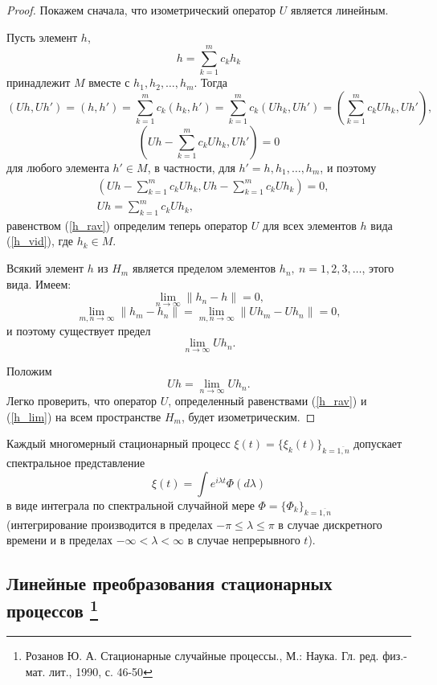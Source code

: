 \begin{proof} Покажем сначала, что изометрический оператор $U$ является линейным.

Пусть элемент $h$, 
\begin{equation} 
	\label{h_vid} h = \sum_{k=1}^{m}c_kh_k 
\end{equation} 
принадлежит $M$ вместе с $h_1, h_2, \ldots, h_m$. Тогда $$(Uh,Uh') = (h,h') = \sum_{k=1}^{m}c_k(h_k,h') = \sum_{k=1}^{m}c_k(Uh_k,Uh') = \left(\sum_{k=1}^{m}c_kUh_k,Uh'\right), $$ $$\left(Uh - \sum_{k=1}^{m}c_kUh_k,Uh'\right) = 0$$ для любого элемента $h' \in M$, в частности, для $h' = h, h_1, \ldots, h_m$, и поэтому
\begin{equation}\label{h_rav}
\begin{split}
    & \left(Uh-\sum_{k=1}^{m}c_kUh_k,Uh-\sum_{k=1}^{m}c_kUh_k\right) = 0, \\
    & Uh = \sum_{k=1}^{m}c_kUh_k,
\end{split}
\end{equation}
равенством (\ref{h_rav}) определим теперь оператор $U$ для всех элементов $h$ вида (\ref{h_vid}), где $h_k \in M$.

 Всякий элемент $h$ из $H_m$ является пределом элементов $h_n, \ n = 1, 2, 3, \ldots$, этого вида. Имеем: $$\lim_{n \to \infty} \parallel   h_n - h\parallel   = 0,$$ $$\lim_{m,n \to \infty} \parallel  h_m - h_n\parallel   = \lim_{m,n \to \infty} \parallel  Uh_m - Uh_n\parallel   = 0,$$ и поэтому существует предел $$\lim_{n \to \infty} Uh_n.$$

 Положим 
\begin{equation}
	 \label{h_lim} Uh = \lim_{n \to \infty} Uh_n. 
\end{equation}
Легко проверить, что оператор $U$, определенный равенствами (\ref{h_rav}) и (\ref{h_lim}) на всем пространстве $H_m$, будет изометрическим.
\end{proof}


\begin{theorem}\label{hellopuza_theor_2.1} Каждый многомерный стационарный процесс $\xi(t) = \{\xi_k(t)\}_{k=\overline{1,n}}$ допускает спектральное представление $$\xi(t) = \int e^{i \lambda t} \Phi(d \lambda)$$ в виде интеграла по спектральной случайной мере $\Phi = \{\Phi_k\}_{k=\overline{1,n}}$ (интегрирование производится в пределах $-\pi \leq \lambda \leq \pi$ в случае дискретного времени и в пределах $-\infty < \lambda < \infty$ в случае непрерывного $t$).
\end{theorem}

\subsection{Линейные преобразования стационарных процессов \footnote{Розанов Ю. А. Стационарные случайные процессы., М.: Наука. Гл. ред. физ.-мат. лит., 1990, с. 46-50}}

